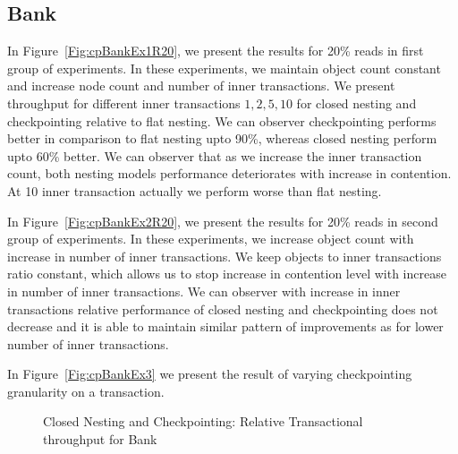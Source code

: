 \documentclass[12pt,english]{report}
\begin{document}
\subsection{Bank}
In Figure~\ref{Fig:cpBankEx1R20}, we present the results for 20\% reads in first group of experiments. In these experiments, we maintain object count constant and increase node count and number of inner transactions. We present throughput for different inner transactions ${1, 2, 5, 10}$ for closed nesting and checkpointing relative to flat nesting. We can observer checkpointing performs better in comparison to flat nesting upto 90\%, whereas closed nesting perform upto 60\% better. We can observer that as we increase the inner transaction count, both nesting models performance deteriorates with increase in contention. At 10 inner transaction actually we perform worse than flat nesting.

In Figure~\ref{Fig:cpBankEx2R20}, we present the results for 20\% reads in second group of experiments. In these experiments, we increase object count with increase in number of inner transactions. We keep objects to inner transactions ratio constant, which allows us to stop increase in contention level with increase in number of inner transactions. We can observer with increase in inner transactions relative performance of closed nesting and checkpointing does not decrease and it is able to maintain similar pattern of improvements as for lower number of inner transactions.

In Figure~\ref{Fig:cpBankEx3} we present the result of varying checkpointing granularity on a transaction.

\begin{figure}[H]
\centering
{}
\end{figure}
\begin{figure}[H]
\centering
{}
\end{figure}
\begin{figure}[H]
\centering
{}
\caption{Closed Nesting and Checkpointing: Relative Transactional throughput for Bank}
\label{Fig:cpBank}
\end{figure}
\end{document}
